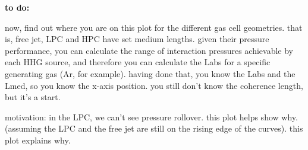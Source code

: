 \textbf{to do:}

now, find out where you are on this plot for the different gas cell geometries. that is, free jet, LPC and HPC have set medium lengths. given their pressure performance, you can calculate the range of interaction pressures achievable by each HHG source, and therefore you can calculate the Labs for a specific generating gas (Ar, for example). having done that, you know the Labs and the Lmed, so you know the x-axis position. you still don't know the coherence length, but it's a start.

motivation: in the LPC, we can't see pressure rollover. this plot helps show why. (assuming the LPC and the free jet are still on the rising edge of the curves). this plot explains why.
